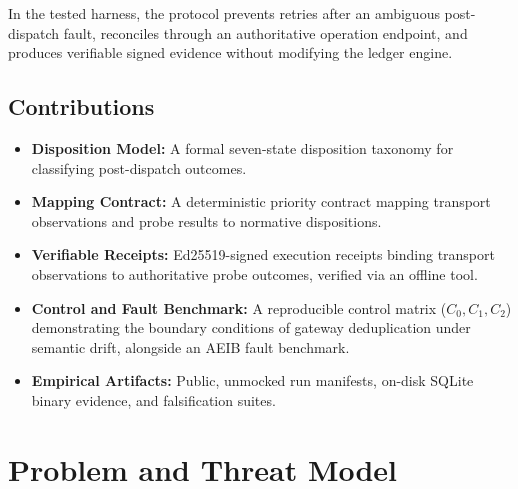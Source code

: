 \documentclass[10pt,journal,compsoc]{IEEEtran}
\begin{document}
In the tested harness, the protocol prevents retries after an ambiguous post-dispatch fault, reconciles through an authoritative operation endpoint, and produces verifiable signed evidence without modifying the ledger engine.

\subsection{Contributions}
\begin{itemize}
    \item \textbf{Disposition Model:} A formal seven-state disposition taxonomy for classifying post-dispatch outcomes.
    \item \textbf{Mapping Contract:} A deterministic priority contract mapping transport observations and probe results to normative dispositions.
    \item \textbf{Verifiable Receipts:} Ed25519-signed execution receipts binding transport observations to authoritative probe outcomes, verified via an offline tool.
    \item \textbf{Control and Fault Benchmark:} A reproducible control matrix ($C_0, C_1, C_2$) demonstrating the boundary conditions of gateway deduplication under semantic drift, alongside an AEIB fault benchmark.
    \item \textbf{Empirical Artifacts:} Public, unmocked run manifests, on-disk SQLite binary evidence, and falsification suites.
\end{itemize}

\section{Problem and Threat Model}
\end{document}
